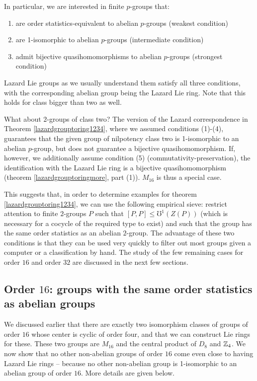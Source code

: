 \documentclass[10pt]{amsart}
\begin{document}
In particular, we are interested in finite $p$-groups that:

\begin{enumerate}
\item are order statistics-equivalent to abelian $p$-groups (weakest
  condition)
\item are 1-isomorphic to abelian $p$-groups (intermediate condition)
\item admit bijective quasihomomorphisms to abelian $p$-groups
  (strongest condition)
\end{enumerate}

Lazard Lie groups as we usually understand them satisfy all three
conditions, with the corresponding abelian group being the Lazard Lie
ring. Note that this holds for class bigger than two as well.

What about $2$-groups of class two? The version of the Lazard correspondence
in Theorem \ref{lazardgrouptoring1234}, where we assumed conditions
(1)-(4), guarantees that the given group of nilpotency class two is
1-isomorphic to an abelian $p$-group, but does not guarantee a
bijective quasihomomorphism. If, however, we additionally assume
condition (5) (commutativity-preservation), the identification with
the Lazard Lie ring is a bijective quasihomomorphism (theorem
\ref{lazardgrouptoringmore}, part (1)). $M_{16}$ is thus a special case.

This suggests that, in order to determine examples for theorem
\ref{lazardgrouptoring1234}, we can use the following empirical sieve:
restrict attention to finite $2$-groups $P$ such that $[P,P] \le
\mho^1(Z(P))$ (which is necessary for a cocycle of the required type
to exist) and such that the group has the same order statistics as an
abelian $2$-group. The advantage of these two conditions is that they
can be used very quickly to filter out most groups given a computer or
a classification by hand. The study of the few remaining cases for
order $16$ and order $32$ are discussed in the next few sections.


\subsection{Order $16$: groups with the same order statistics as abelian groups}

We discussed earlier that there are exactly two isomorphism classes of
groups of order $16$ whose center is cyclic of order four, and that we
can construct Lie rings for these. These two groups are $M_{16}$ and
the central product of $D_8$ and $\mathbb{Z}_4$. We now show that no other
non-abelian groups of order $16$ come even close to having Lazard Lie
rings -- because no other non-abelian group is 1-isomorphic to an
abelian group of order $16$. More details are given below.
\end{document}
